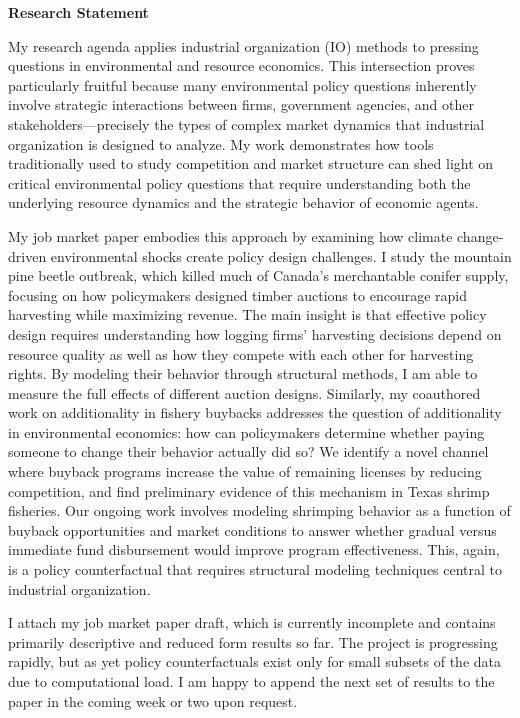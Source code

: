 \documentclass[11pt,letterpaper]{article}
\newenvironment{cvheader}
{\begin{center}\Large}
{\end{center}}
\begin{document}
\begin{cvheader}
{\Huge\textbf{Research Statement}}
\end{cvheader}

\vspace{8pt}

My research agenda applies industrial organization (IO) methods to pressing questions in environmental and resource economics. This intersection proves particularly fruitful because many environmental policy questions inherently involve strategic interactions between firms, government agencies, and other stakeholders—precisely the types of complex market dynamics that industrial organization is designed to analyze. My work demonstrates how tools traditionally used to study competition and market structure can shed light on critical environmental policy questions that require understanding both the underlying resource dynamics and the strategic behavior of economic agents.

My job market paper embodies this approach by examining how climate change-driven environmental shocks create policy design challenges. I study the mountain pine beetle outbreak, which killed much of Canada's merchantable conifer supply, focusing on how policymakers designed timber auctions to encourage rapid harvesting while maximizing revenue. The main insight is that effective policy design requires understanding how logging firms' harvesting decisions depend on resource quality as well as how they compete with each other for harvesting rights. By modeling their behavior through structural methods, I am able to measure the full effects of different auction designs. Similarly, my coauthored work on additionality in fishery buybacks addresses the question of additionality in environmental economics: how can policymakers determine whether paying someone to change their behavior actually did so? We identify a novel channel where buyback programs increase the value of remaining licenses by reducing competition, and find preliminary evidence of this mechanism in Texas shrimp fisheries. Our ongoing work involves modeling shrimping behavior as a function of buyback opportunities and market conditions to answer whether gradual versus immediate fund disbursement would improve program effectiveness. This, again, is a policy counterfactual that requires structural modeling techniques central to industrial organization.

I attach my job market paper draft, which is currently incomplete and contains primarily descriptive and reduced form results so far. The project is progressing rapidly, but as yet policy counterfactuals exist only for small subsets of the data due to computational load. I am happy to append the next set of results to the paper in the coming week or two upon request.
\end{document}
